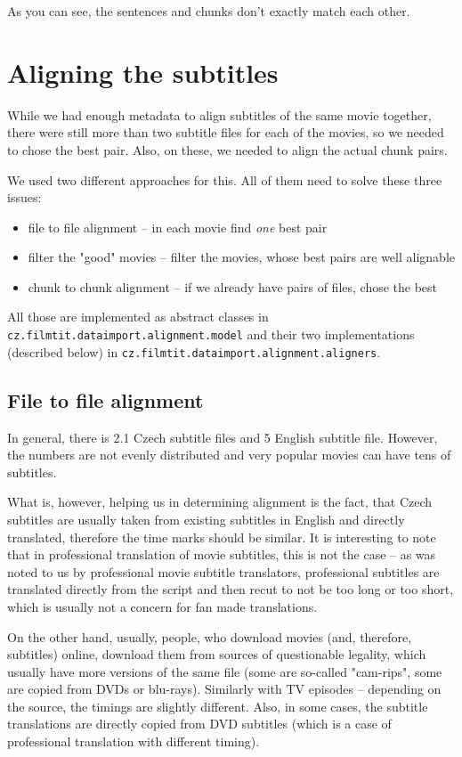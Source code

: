 As you can see, the sentences and chunks don't exactly match each other.

\section{Aligning the subtitles}

While we had enough metadata to align subtitles of the same movie together, there were still more than two subtitle files for each of the movies, so we needed to chose the best pair. Also, on these, we needed to align the actual chunk pairs.

We used two different approaches for this. All of them need to solve these three issues:
\begin{itemize}
    \item file to file alignment -- in each movie find \emph{one} best pair
    \item filter the "good" movies -- filter the movies, whose best pairs are well alignable
    \item chunk to chunk alignment -- if we already have pairs of files, chose the best  
\end{itemize}

All those are implemented as abstract classes in \texttt{cz.filmtit.dataimport.alignment.model} and their two implementations (described below) in \texttt{cz.filmtit.dataimport.alignment.aligners}.

\subsection{File to file alignment}
In general, there is 2.1 Czech subtitle files and 5 English subtitle file. However, the numbers are not evenly distributed and very popular movies can have tens of subtitles.

What is, however, helping us in determining alignment is the fact, that Czech subtitles are usually taken from existing subtitles in English and directly translated, therefore the time marks should be similar. It is interesting to note that in professional translation of movie subtitles, this is not the case -- as was noted to us by professional movie subtitle translators, professional subtitles are translated directly from the script and then recut to not be too long or too short, which is usually not a concern for fan made translations. 

On the other hand, usually, people, who download movies (and, therefore, subtitles) online, download them from sources of questionable legality, which usually have more versions of the same file (some are so-called "cam-rips", some are copied from DVDs or blu-rays). Similarly with TV episodes -- depending on the source, the timings are slightly different. Also, in some cases, the subtitle translations are directly copied from DVD subtitles (which is a case of professional translation with different timing).

